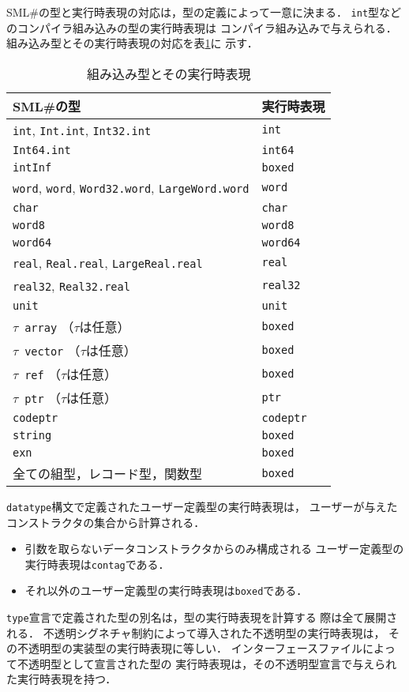 \documentclass{jbook}
\newcommand{\smlsharp}{SML\#}
\begin{document}
	\smlsharp{}の型と実行時表現の対応は，型の定義によって一意に決まる．
	{\tt int}型などのコンパイラ組み込みの型の実行時表現は
コンパイラ組み込みで与えられる．
	組み込み型とその実行時表現の対応を表\ref{tab:builtinRuntimeTypes}に
示す．
\begin{table}
\begin{center}
\begin{tabular}{|l|l|}
\hline
\smlsharp{}の型 & 実行時表現 \\ \hline
{\tt int}, {\tt Int.int}, {\tt Int32.int} & {\tt int} \\
{\tt Int64.int} & {\tt int64} \\
{\tt intInf} & {\tt boxed} \\
{\tt word}, {\tt word}, {\tt Word32.word}, {\tt LargeWord.word} & {\tt word} \\
{\tt char} & {\tt char} \\
{\tt word8} & {\tt word8} \\
{\tt word64} & {\tt word64} \\
{\tt real}, {\tt Real.real}, {\tt LargeReal.real} & {\tt real} \\
{\tt real32}, {\tt Real32.real} & {\tt real32} \\
{\tt unit} & {\tt unit} \\
{\tt $\tau$ array} （$\tau$は任意）& {\tt boxed}\\
{\tt $\tau$ vector} （$\tau$は任意） & {\tt boxed}\\
{\tt $\tau$ ref} （$\tau$は任意） & {\tt boxed}\\
{\tt $\tau$ ptr} （$\tau$は任意） & {\tt ptr}\\
{\tt codeptr} & {\tt codeptr}\\
{\tt string} & {\tt boxed}\\
{\tt exn} & {\tt boxed}\\
全ての組型，レコード型，関数型 & {\tt boxed}\\
\hline
\end{tabular}
\end{center}
\caption{組み込み型とその実行時表現}
\label{tab:builtinRuntimeTypes}
\end{table}
	{\tt datatype}構文で定義されたユーザー定義型の実行時表現は，
ユーザーが与えたコンストラクタの集合から計算される．
\begin{itemize}
\item
	引数を取らないデータコンストラクタからのみ構成される
ユーザー定義型の実行時表現は{\tt contag}である．
\item
	それ以外のユーザー定義型の実行時表現は{\tt boxed}である．
\end{itemize}
	{\tt type}宣言で定義された型の別名は，型の実行時表現を計算する
際は全て展開される．
	不透明シグネチャ制約によって導入された不透明型の実行時表現は，
その不透明型の実装型の実行時表現に等しい．
	インターフェースファイルによって不透明型として宣言された型の
実行時表現は，その不透明型宣言で与えられた実行時表現を持つ．
\end{document}
